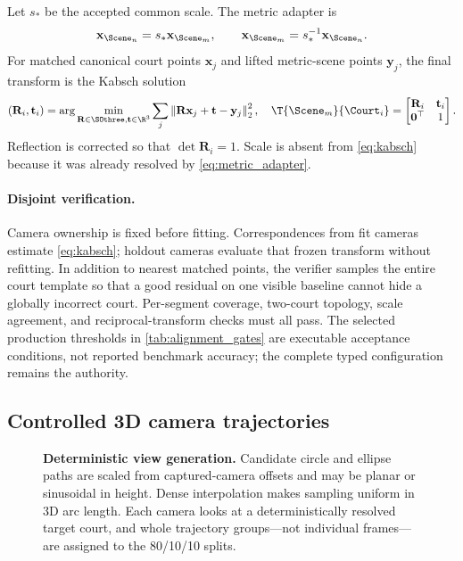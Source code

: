Let \(s_*\) be the accepted common scale.  The metric adapter is
\begin{equation}
  \mathbf{x}_{\Scene_n}=s_*\mathbf{x}_{\Scene_m},\qquad
  \mathbf{x}_{\Scene_m}=s_*^{-1}\mathbf{x}_{\Scene_n}.
  \label{eq:metric_adapter}
\end{equation}
For matched canonical court points \(\mathbf{x}_j\) and lifted metric-scene
points \(\mathbf{y}_j\), the final transform is the Kabsch solution
\begin{equation}
  (\mathbf{R}_i,\mathbf{t}_i)=
  \arg\min_{\mathbf{R}\in\SOthree,\mathbf{t}\in\R^3}
    \sum_j \left\|\mathbf{R}\mathbf{x}_j+\mathbf{t}-\mathbf{y}_j\right\|_2^2,
  \quad
  \T{\Scene_m}{\Court_i}=
  \begin{bmatrix}\mathbf{R}_i&\mathbf{t}_i\\\mathbf{0}^{\top}&1\end{bmatrix}.
  \label{eq:kabsch}
\end{equation}
Reflection is corrected so that \(\det\mathbf{R}_i=1\).  Scale is absent from
\cref{eq:kabsch} because it was already resolved by \cref{eq:metric_adapter}.

\paragraph{Disjoint verification.}
Camera ownership is fixed before fitting.  Correspondences from fit cameras
estimate \cref{eq:kabsch}; holdout cameras evaluate that frozen transform
without refitting.  In addition to nearest matched points, the verifier samples
the entire court template so that a good residual on one visible baseline
cannot hide a globally incorrect court.  Per-segment coverage, two-court
topology, scale agreement, and reciprocal-transform checks must all pass.  The
selected production thresholds in \cref{tab:alignment_gates} are executable
acceptance conditions, not reported benchmark accuracy; the complete typed
configuration remains the authority.



\subsection{Controlled 3D camera trajectories}
\label{sec:trajectories}

\begin{figure}[t]
  \centering
  \resizebox{\linewidth}{!}{}
  \caption{\textbf{Deterministic view generation.}  Candidate circle and
  ellipse paths are scaled from captured-camera offsets and may be planar or
  sinusoidal in height.  Dense interpolation makes sampling uniform in 3D arc
  length.  Each camera looks at a deterministically resolved target court, and
  whole trajectory groups---not individual frames---are assigned to the
  80/10/10 splits.}
  \label{fig:trajectories}
\end{figure}


